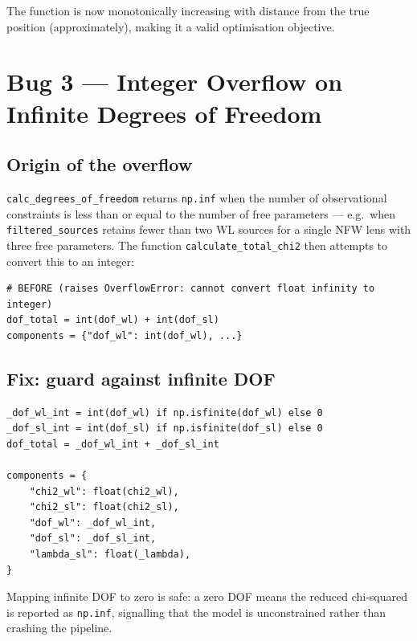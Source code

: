 \documentclass[12pt]{article}
\begin{document}
The function is now monotonically increasing with distance from the true position
(approximately), making it a valid optimisation objective.

\section{Bug 3 --- Integer Overflow on Infinite Degrees of Freedom}
\label{sec:bug3}

\subsection{Origin of the overflow}

\texttt{calc\_degrees\_of\_freedom} returns \texttt{np.inf} when the number of
observational constraints is less than or equal to the number of free parameters ---
e.g.\ when \texttt{filtered\_sources} retains fewer than two WL sources for a
single NFW lens with three free parameters.  The function \texttt{calculate\_total\_chi2}
then attempts to convert this to an integer:

\begin{lstlisting}
# BEFORE (raises OverflowError: cannot convert float infinity to integer)
dof_total = int(dof_wl) + int(dof_sl)
components = {"dof_wl": int(dof_wl), ...}
\end{lstlisting}

\subsection{Fix: guard against infinite DOF}

\begin{lstlisting}
_dof_wl_int = int(dof_wl) if np.isfinite(dof_wl) else 0
_dof_sl_int = int(dof_sl) if np.isfinite(dof_sl) else 0
dof_total = _dof_wl_int + _dof_sl_int

components = {
    "chi2_wl": float(chi2_wl),
    "chi2_sl": float(chi2_sl),
    "dof_wl": _dof_wl_int,
    "dof_sl": _dof_sl_int,
    "lambda_sl": float(_lambda),
}
\end{lstlisting}

Mapping infinite DOF to zero is safe: a zero DOF means the reduced chi-squared is
reported as \texttt{np.inf}, signalling that the model is unconstrained rather than
crashing the pipeline.

\end{document}
